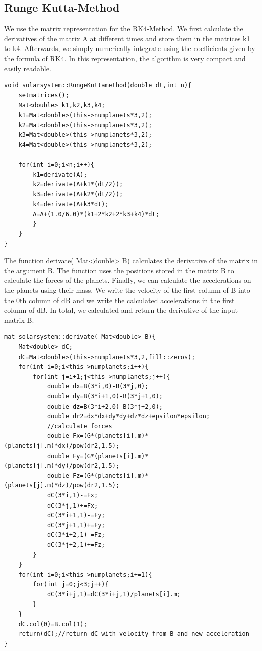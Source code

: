 \documentclass[10pt,a4paper]{article}
\begin{document}
\subsection{Runge Kutta-Method}
We use the matrix representation for the RK4-Method. We first calculate the derivatives of the matrix A at different times and store them in the matrices k1 to k4. Afterwards, we simply numerically integrate using the coefficients given by the formula of RK4. In this representation, the algorithm is very compact and easily readable.  
\begin{lstlisting}
void solarsystem::RungeKuttamethod(double dt,int n){
    setmatrices();
    Mat<double> k1,k2,k3,k4;
    k1=Mat<double>(this->numplanets*3,2);
    k2=Mat<double>(this->numplanets*3,2);
    k3=Mat<double>(this->numplanets*3,2);
    k4=Mat<double>(this->numplanets*3,2);

    for(int i=0;i<n;i++){
        k1=derivate(A);
        k2=derivate(A+k1*(dt/2));
        k3=derivate(A+k2*(dt/2));
        k4=derivate(A+k3*dt);
        A=A+(1.0/6.0)*(k1+2*k2+2*k3+k4)*dt;
        }
    }
}
\end{lstlisting}
The function derivate( Mat<double> B) calculates the derivative of the matrix in the argument B. The function uses the positions stored in the matrix B to calculate the forces of the planets. Finally, we can calculate the accelerations on the planets using their mass. We write the velocity of the first column of B into the 0th column of dB and we write the calculated accelerations in the first column of dB. 
In total, we calculated and return the derivative of the input matrix B.
\begin{lstlisting}
mat solarsystem::derivate( Mat<double> B){
    Mat<double> dC;
    dC=Mat<double>(this->numplanets*3,2,fill::zeros);
    for(int i=0;i<this->numplanets;i++){
        for(int j=i+1;j<this->numplanets;j++){
            double dx=B(3*i,0)-B(3*j,0);
            double dy=B(3*i+1,0)-B(3*j+1,0);
            double dz=B(3*i+2,0)-B(3*j+2,0);
            double dr2=dx*dx+dy*dy+dz*dz+epsilon*epsilon;
            //calculate forces
            double Fx=(G*(planets[i].m)*(planets[j].m)*dx)/pow(dr2,1.5);
            double Fy=(G*(planets[i].m)*(planets[j].m)*dy)/pow(dr2,1.5);
            double Fz=(G*(planets[i].m)*(planets[j].m)*dz)/pow(dr2,1.5);
            dC(3*i,1)-=Fx;
            dC(3*j,1)+=Fx;
            dC(3*i+1,1)-=Fy;
            dC(3*j+1,1)+=Fy;
            dC(3*i+2,1)-=Fz;
            dC(3*j+2,1)+=Fz;
        }
    }
    for(int i=0;i<this->numplanets;i+=1){
        for(int j=0;j<3;j++){
            dC(3*i+j,1)=dC(3*i+j,1)/planets[i].m;
        }
    }
    dC.col(0)=B.col(1);
    return(dC);//return dC with velocity from B and new acceleration
}
\end{lstlisting}
\end{document}
